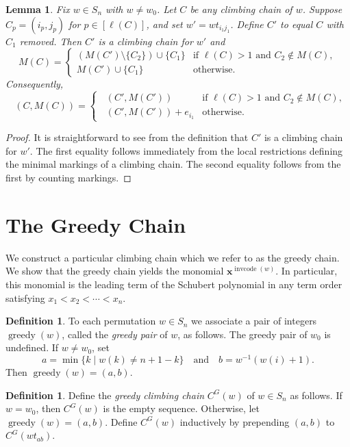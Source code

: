 \documentclass[11pt]{amsart}
\newtheorem{lemma}[theorem]{Lemma}
\theoremstyle{definition}
\newtheorem{definition}[theorem]{Definition}
\theoremstyle{named}
\newcommand{\CG}{C^G}
\DeclareMathOperator{\cc}{\mathrm{invcode}} %
\DeclareMathOperator{\greedy}{\mathrm{greedy}}
\DeclareMathOperator{\dwt}{\overline{\mathrm{wt}}}
\begin{document}
	\begin{lemma}
		\label{lem:markingrecursion}
		Fix $w\in S_n$ with $w\neq w_0$. Let $C$ be any climbing chain of $w$. Suppose $C_p=(i_p,j_p)$ for $p\in [\ell(C)]$, and set $w'=wt_{i_1j_1}$. Define $C'$ to equal $C$ with $C_1$ removed. Then $C'$ is a climbing chain for $w'$ and 
		\[
		M(C) = 
		\begin{cases}
		(M(C')\setminus\{C_2\})\cup \{C_1\}&\mbox{if } \ell(C)>1 \mbox{ and }C_2\notin M(C),\\
		M(C')\cup \{C_1\}&\mbox{otherwise}.
		\end{cases} 
		\]		
		Consequently,
		\[
			\dwt(C,M(C)) = 
			\begin{cases}
				\dwt(C',M(C'))&\mbox{if } \ell(C)>1 \mbox{ and }C_2\notin M(C),\\
				\dwt(C',M(C'))+e_{i_1}&\mbox{otherwise}.
			\end{cases}
		\] 
	\end{lemma}
	\begin{proof}
		It is straightforward to see from the definition that $C'$ is a climbing chain for $w'$. 
		The first equality follows immediately from the local restrictions defining the minimal markings of a climbing chain. The second equality follows from the first by counting markings.
	\end{proof}
	
		\section{The Greedy Chain}\label{sec:greedy}
		
	We construct a particular climbing chain which we refer to as the greedy chain. We show that the greedy chain yields the monomial $\bm{x}^{\cc(w)}$. In particular, this monomial is the leading term of the Schubert polynomial in any term order satisfying $x_1<x_2<\cdots<x_n$. 
	
	\begin{definition}
		To each permutation $w\in S_n$ we associate a pair of integers $\greedy(w)$, called the \emph{greedy pair} of $w$, as follows. The greedy pair of $w_0$ is undefined. If $w\neq w_0$, set 
		\[a=\min\{k\mid w(k)\neq n+1-k\}\quad \mbox{and}\quad b=w^{-1}(w(i)+1).\] 
		 Then $\greedy(w)=(a,b)$.
	\end{definition}

	\begin{definition}
		Define the \emph{greedy climbing chain} $\CG(w)$ of $w\in S_n$ as follows. If $w=w_0$, then $\CG(w)$ is the empty sequence. Otherwise, let $\greedy(w)=(a,b)$. Define $\CG(w)$ inductively by prepending $(a,b)$ to $\CG(wt_{ab})$.
	\end{definition}
	
\end{document}
